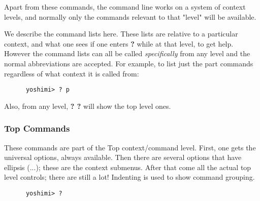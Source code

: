    Apart from these commands, the command line works on a system of context
   levels, and normally only the commands relevant to that "level"
   will be available.

   We describe the command lists here. These lists are relative to a
   particular context, and what one sees if one enters \textbf{?} while at
   that level, to get help. However the command lists can all be called
   \textsl{specifically} from any level and the normal abbreviations are
   accepted. For example, to list just the part commands regardless of what
   context it is called from:
   \begin{verbatim}
      yoshimi> ? p
   \end{verbatim}
   \noindent Also, from any level, \textbf{? ?} will show the top level ones.

\subsubsection{Top Commands}
\label{subsec:command_line_top_command_list}

   These commands are part of the Top context/command level. First, one gets
   the universal options, always available. Then there are several options
   that have ellipsis (...); these are the context submenus. After that come
   all the actual top level controls; there are still a lot!
   Indenting is used to show command grouping.

   \begin{verbatim}
      yoshimi> ?
   \end{verbatim}


